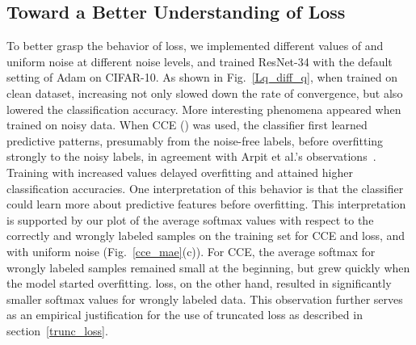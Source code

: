\documentclass{article}
\begin{document}
\subsection{Toward a Better Understanding of  Loss}
\label{Lq_exp}
To better grasp the behavior of  loss, we implemented different values of  and uniform noise at different noise levels, and trained ResNet-34 with the default setting of Adam on CIFAR-10. 
As shown in Fig.~\ref{Lq_diff_q}, when trained on clean dataset, increasing  not only slowed down the rate of convergence, but also lowered the classification accuracy. 
More interesting phenomena appeared when trained on noisy data. When CCE () was used, the classifier first learned predictive patterns, presumably from the noise-free labels, before overfitting strongly to the noisy labels, in agreement with Arpit et al.'s observations~\cite{arpit2017closer}. 
Training with increased  values delayed overfitting and attained higher classification accuracies. 
One interpretation of this behavior is that the classifier could learn more about predictive features before overfitting.
This interpretation is supported by our plot of the average softmax values with respect to the correctly and wrongly labeled samples on the training set for CCE and   loss, and with  uniform noise (Fig.~\ref{cce_mae}(c)). 
For CCE, the average softmax for wrongly labeled samples remained small at the beginning, but grew quickly when the model started overfitting. 
 loss, on the other hand, resulted in significantly smaller softmax values for wrongly labeled data.
This observation further serves as an empirical justification for the use of truncated  loss as described in section~\ref{trunc_loss}.
\end{document}
